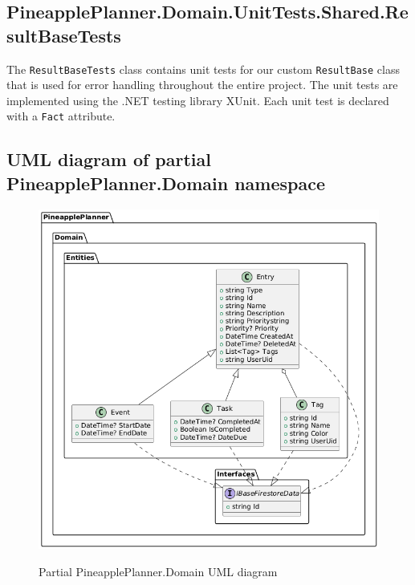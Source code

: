 \documentclass{article}
\begin{document}

\bigbreak

\subsection{PineapplePlanner.Domain.UnitTests.Shared.ResultBaseTests}

The \verb|ResultBaseTests| class contains unit tests for our custom \verb|ResultBase| class that is used for error handling throughout the entire project.
The unit tests are implemented using the .NET testing library XUnit.
Each unit test is declared with a \verb|Fact| attribute.


\bigbreak

\subsection{UML diagram of partial PineapplePlanner.Domain namespace}

\begin{figure}[H]
  \centering
  \includegraphics[width=1\textwidth]{images/domain_uml_diagram.png}
  \label{Partial PineapplePlanner.Domain UML diagram}
  \caption{Partial PineapplePlanner.Domain UML diagram}
\end{figure}
\end{document}
